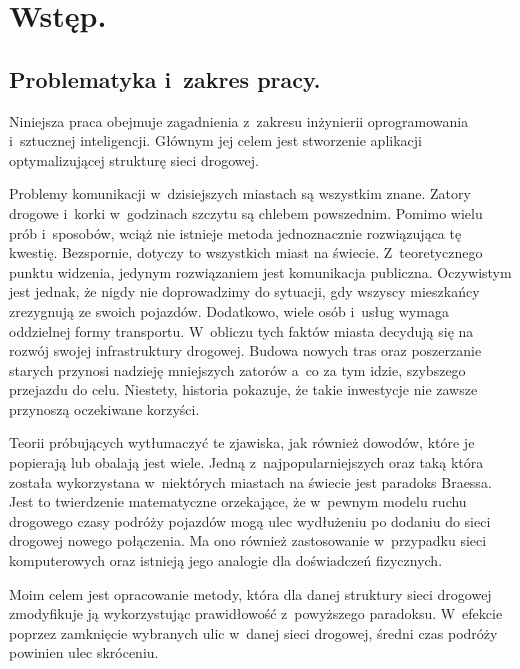 \documentclass[twoside,12pt]{report}
\let\oldsection\chapter
\def\chapter{\cleardoublepage\oldsection}
\begin{document}


\tableofcontents	%

\chapter{Wstęp.} \label{rozdz.wstep} 

\section{Problematyka i~zakres pracy.}

Niniejsza praca obejmuje zagadnienia z~zakresu inżynierii oprogramowania i~sztucznej inteligencji. Głównym jej celem jest stworzenie aplikacji optymalizującej strukturę sieci drogowej.

Problemy komunikacji w~dzisiejszych miastach są wszystkim znane. Zatory drogowe i~korki w~godzinach szczytu są chlebem powszednim. Pomimo wielu prób i~sposobów, wciąż nie istnieje metoda jednoznacznie rozwiązująca tę kwestię. Bezspornie, dotyczy to wszystkich miast na świecie. Z~teoretycznego punktu widzenia, jedynym rozwiązaniem jest komunikacja publiczna. Oczywistym jest jednak, że nigdy nie doprowadzimy do sytuacji, gdy wszyscy mieszkańcy zrezygnują ze swoich pojazdów. Dodatkowo, wiele osób i~usług wymaga oddzielnej formy transportu. W~obliczu tych faktów miasta decydują się na rozwój swojej infrastruktury drogowej. Budowa nowych tras oraz poszerzanie starych przynosi nadzieję mniejszych zatorów a~co za tym idzie, szybszego przejazdu do celu. Niestety, historia pokazuje, że takie inwestycje nie zawsze przynoszą oczekiwane korzyści.

Teorii próbujących wytłumaczyć te zjawiska, jak również dowodów, które je popierają lub obalają jest wiele. Jedną z~najpopularniejszych oraz taką która została wykorzystana w~niektórych miastach na świecie jest paradoks Braessa\cite{braess}. Jest to twierdzenie matematyczne orzekające, że w~pewnym modelu ruchu drogowego czasy podróży pojazdów mogą ulec wydłużeniu po dodaniu do sieci drogowej nowego połączenia. Ma ono również  zastosowanie w~przypadku  sieci komputerowych oraz istnieją jego analogie dla doświadczeń fizycznych.

Moim celem jest opracowanie metody, która dla danej struktury sieci drogowej zmodyfikuje ją wykorzystując prawidłowość z~powyższego paradoksu. W~efekcie poprzez zamknięcie wybranych ulic w~danej sieci drogowej, średni czas podróży powinien ulec skróceniu.
\end{document}
